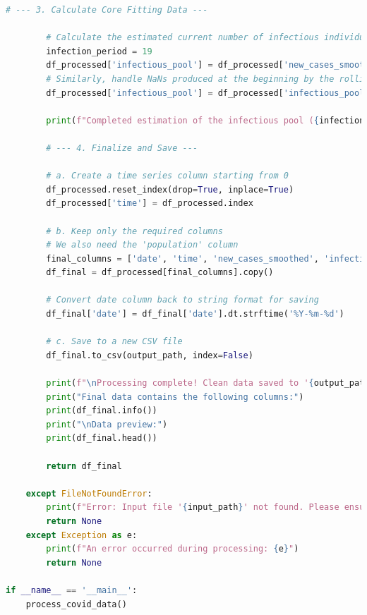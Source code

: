 \documentclass[12pt, a4paper]{article}
\begin{document}
\begin{lstlisting}[language=Python, caption=Python script for processing raw OWID data into a clean dataset for Germany.]
        # --- 3. Calculate Core Fitting Data ---

        # Calculate the estimated current number of infectious individuals (19-day rolling sum)
        infection_period = 19
        df_processed['infectious_pool'] = df_processed['new_cases_smoothed'].rolling(window=infection_period).sum()
        # Similarly, handle NaNs produced at the beginning by the rolling sum
        df_processed['infectious_pool'] = df_processed['infectious_pool'].fillna(0)

        print(f"Completed estimation of the infectious pool ({infection_period}-day rolling sum).")

        # --- 4. Finalize and Save ---
        
        # a. Create a time series column starting from 0
        df_processed.reset_index(drop=True, inplace=True)
        df_processed['time'] = df_processed.index

        # b. Keep only the required columns
        # We also need the 'population' column
        final_columns = ['date', 'time', 'new_cases_smoothed', 'infectious_pool', 'population']
        df_final = df_processed[final_columns].copy()

        # Convert date column back to string format for saving
        df_final['date'] = df_final['date'].dt.strftime('%Y-%m-%d')

        # c. Save to a new CSV file
        df_final.to_csv(output_path, index=False)
        
        print(f"\nProcessing complete! Clean data saved to '{output_path}'.")
        print("Final data contains the following columns:")
        print(df_final.info())
        print("\nData preview:")
        print(df_final.head())
        
        return df_final

    except FileNotFoundError:
        print(f"Error: Input file '{input_path}' not found. Please ensure the file exists.")
        return None
    except Exception as e:
        print(f"An error occurred during processing: {e}")
        return None

if __name__ == '__main__':
    process_covid_data()
\end{lstlisting}


\end{document}
